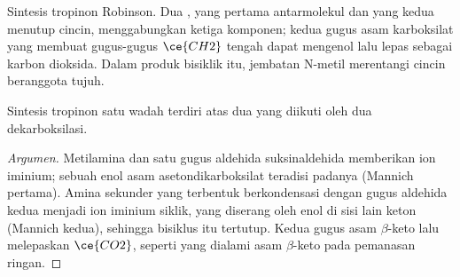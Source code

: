 \begin{omfigure}

{\small Sintesis tropinon Robinson. Dua , yang pertama
antarmolekul dan yang kedua menutup cincin, menggabungkan ketiga komponen;
kedua gugus asam karboksilat yang membuat gugus-gugus $\ce{CH2}$ tengah dapat mengenol lalu
lepas sebagai karbon dioksida. Dalam produk bisiklik itu, jembatan N-metil merentangi
cincin beranggota tujuh.}
\end{omfigure}

\begin{proposition}\label{prop:b3:total-synthesis:tropinone}
Sintesis tropinon satu wadah terdiri atas dua  yang diikuti oleh dua
dekarboksilasi.
\end{proposition}

\begin{proof}[Argumen]
Metilamina dan satu gugus aldehida suksinaldehida memberikan ion iminium; sebuah
enol asam asetondikarboksilat teradisi padanya (Mannich pertama). Amina sekunder
yang terbentuk berkondensasi dengan gugus aldehida kedua menjadi ion iminium siklik,
yang diserang oleh enol di sisi lain keton (Mannich kedua),
sehingga bisiklus itu tertutup. Kedua gugus asam $\beta$-keto lalu melepaskan $\ce{CO2}$, seperti yang dialami asam $\beta$-keto
pada pemanasan ringan.
\end{proof}

